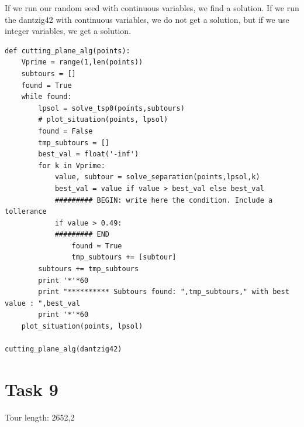\documentclass[a4paper,10pt]{article}
\begin{document}
If we run our random seed with continuous variables, we find a solution. If we run the dantzig42 with continuous variables, we do not get a solution, but if we use integer variables, we get a solution. 

\begin{lstlisting}
def cutting_plane_alg(points):
    Vprime = range(1,len(points))
    subtours = []
    found = True
    while found:
        lpsol = solve_tsp0(points,subtours)
        # plot_situation(points, lpsol)
        found = False
        tmp_subtours = []
        best_val = float('-inf')
        for k in Vprime:
            value, subtour = solve_separation(points,lpsol,k)
            best_val = value if value > best_val else best_val
            ######### BEGIN: write here the condition. Include a tollerance
            if value > 0.49: 
            ######### END
                found = True
                tmp_subtours += [subtour]
        subtours += tmp_subtours
        print '*'*60
        print "********** Subtours found: ",tmp_subtours," with best value : ",best_val
        print '*'*60
    plot_situation(points, lpsol)
    
cutting_plane_alg(dantzig42)
\end{lstlisting}

\newpage
\section*{Task 9}

Tour length: 2652,2
\end{document}
